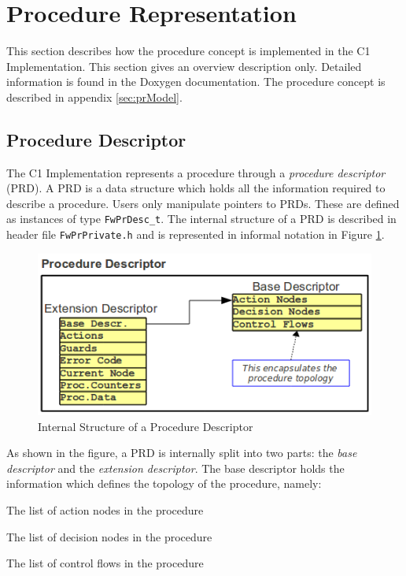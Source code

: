 \documentclass[a4paper,10pt]{article}
\let\stdsection\section
\renewcommand\section{\newpage\stdsection}
\newenvironment{fw_itemize}						%
{\begin{itemize}
  \setlength{\itemsep}{1mm}
  \setlength{\parskip}{0pt}
  \setlength{\parsep}{0pt}}
{\end{itemize}}
\begin{document}


\section{Procedure Representation}
This section describes how the procedure concept is implemented in the C1 Implementation. 
This section gives an overview description only. Detailed information is found in the 
Doxygen documentation. The procedure concept is described in appendix \ref{sec:prModel}.

\subsection{Procedure Descriptor}\label{sec:prDesc}
The C1 Implementation represents a procedure through a \emph{procedure descriptor} (PRD). 
A PRD is a data structure which holds all the information required to describe a procedure. 
Users only manipulate pointers to PRDs. These are defined as instances of type \texttt{FwPrDesc\_t}. The internal structure of a PRD is described 
in header file \texttt{FwPrPrivate.h} and is represented in informal notation in Figure \ref{fig:PRD}. 

\begin{figure}[ht]
 \centering
 \includegraphics[scale=0.6,keepaspectratio=true]{../images/PRD.png}
 \caption{Internal Structure of a Procedure Descriptor}
 \label{fig:PRD}
\end{figure}

As shown in the figure, a PRD is internally split into two parts: the \emph{base descriptor} 
and the \emph{extension descriptor}. The base descriptor holds the information which defines 
the topology of the procedure, namely:

\begin{fw_itemize}
\item The list of action nodes in the procedure
\item The list of decision nodes in the procedure
\item The list of control flows in the procedure
\end{fw_itemize}
\end{document}
